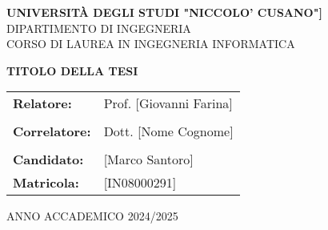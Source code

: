 \documentclass[12pt,a4paper,oneside]{book}
\begin{document}
\begin{titlepage}
    \begin{center}
        \vspace*{2cm}
        
        {\Large \textbf{UNIVERSITÀ DEGLI STUDI "NICCOLO' CUSANO"]}}\\
        \vspace{0.5cm}
        {\large DIPARTIMENTO DI INGEGNERIA}\\
        \vspace{0.5cm}
        {\large CORSO DI LAUREA IN INGEGNERIA INFORMATICA}\\
        
        \vspace{3cm}
        
        {\Huge \textbf{TITOLO DELLA TESI}}\\
        
        \vspace{3cm}
        
        \begin{flushleft}
            \begin{tabular}{ll}
                \textbf{Relatore:} & Prof. [Giovanni Farina] \\
                & \\
                \textbf{Correlatore:} & Dott. [Nome Cognome] \\
                & \\
                \textbf{Candidato:} & [Marco Santoro] \\
                \textbf{Matricola:} & [IN08000291] \\
            \end{tabular}
        \end{flushleft}
        
        \vfill
        
        {\large ANNO ACCADEMICO 2024/2025}
        
    \end{center}
\end{titlepage}

\tableofcontents
\newpage
\end{document}
